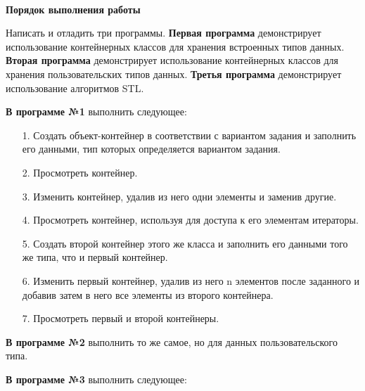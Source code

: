 \paragraph{} \textbf{Порядок выполнения работы}

Написать и отладить три программы.
\textbf{Первая программа} демонстрирует использование контейнерных классов для хранения встроенных типов данных.
\textbf{Вторая программа} демонстрирует использование контейнерных классов для хранения пользовательских типов данных.
\textbf{Третья программа} демонстрирует использование алгоритмов STL.

\textbf{В программе №1} выполнить следующее:

\begin{enumerate}
    \item [1.] Создать объект-контейнер в соответствии с вариантом задания и заполнить его данными, тип которых определяется вариантом задания.
    \item [2.] Просмотреть контейнер.
    \item [3.] Изменить контейнер, удалив из него одни элементы и заменив другие.
    \item [4.] Просмотреть контейнер, используя для доступа к его элементам итераторы.
    \item [5.] Создать второй контейнер этого же класса и заполнить его данными того же типа, что и первый контейнер.
    \item [6.] Изменить первый контейнер, удалив из него n элементов после заданного и добавив затем в него все элементы из второго контейнера.
    \item [7.] Просмотреть первый  и второй контейнеры.
\end{enumerate}

\textbf{В программе №2} выполнить то же самое, но для данных пользовательского типа.

\textbf{В программе №3} выполнить следующее:

